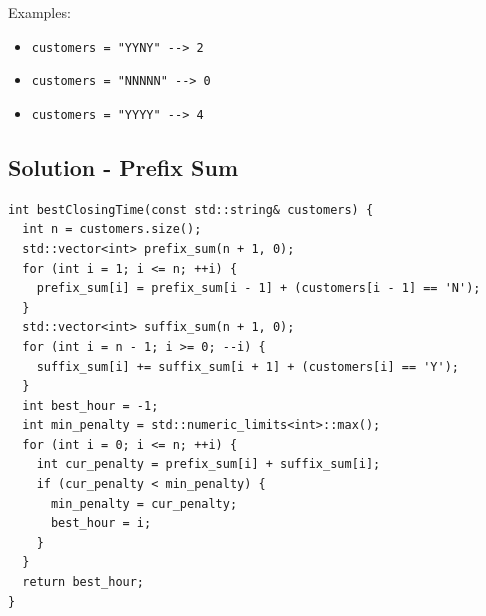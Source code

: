 Examples:
\begin{itemize}
\item {\colorbox{CodeBackground}{\lstinline|customers = "YYNY" --> 2|}}
\item {\colorbox{CodeBackground}{\lstinline|customers = "NNNNN" --> 0|}}
\item {\colorbox{CodeBackground}{\lstinline|customers = "YYYY" --> 4|}}
\end{itemize}

\subsection*{Solution - Prefix Sum}
\begin{lstlisting}
int bestClosingTime(const std::string& customers) {
  int n = customers.size();
  std::vector<int> prefix_sum(n + 1, 0);
  for (int i = 1; i <= n; ++i) {
    prefix_sum[i] = prefix_sum[i - 1] + (customers[i - 1] == 'N');
  }
  std::vector<int> suffix_sum(n + 1, 0);
  for (int i = n - 1; i >= 0; --i) {
    suffix_sum[i] += suffix_sum[i + 1] + (customers[i] == 'Y');
  }
  int best_hour = -1;
  int min_penalty = std::numeric_limits<int>::max();
  for (int i = 0; i <= n; ++i) {
    int cur_penalty = prefix_sum[i] + suffix_sum[i];
    if (cur_penalty < min_penalty) {
      min_penalty = cur_penalty;
      best_hour = i;
    }
  }
  return best_hour;
}
\end{lstlisting}